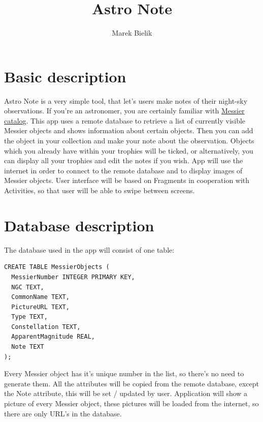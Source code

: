 \documentclass[a4paper]{article}
\title{Astro Note}
\author{Marek Bielik}
\begin{document}
\maketitle

\section*{Basic description}
Astro Note is a very simple tool, that let's users make notes of their night-sky observations. If you're an astronomer, you are certainly familiar with \href{https://en.wikipedia.org/wiki/List_of_Messier_objects}{Messier catalog}. This app uses a remote database to retrieve a list of currently visible Messier objects and shows information about certain objects. Then you can add the object in your collection and make your note about the observation. Objects which you already have within your trophies will be ticked, or alternatively, you can display all your trophies and edit the notes if you wish. \newline \newline
App will use the internet in order to connect to the remote database and to display images of Messier objects. User interface will be based on Fragments in cooperation with Activities, so that user will be able to swipe between screens. \newline \newline

\section*{Database description}
The database used in the app will consist of one table:
\begin{verbatim}
CREATE TABLE MessierObjects (
  MessierNumber INTEGER PRIMARY KEY,
  NGC TEXT,
  CommonName TEXT,
  PictureURL TEXT,
  Type TEXT,
  Constellation TEXT,
  ApparentMagnitude REAL,
  Note TEXT
);
\end{verbatim}
Every Messier object has it's unique number in the list, so there's no need to generate them. All the attributes will be copied from the remote database, except the Note attribute, this will be set / updated by user. Application will show a picture of every Messier object, these pictures will be loaded from the internet, so there are only URL's in the database.
\end{document}
